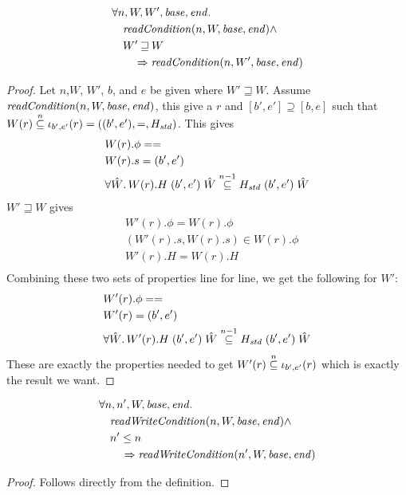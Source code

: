 \documentclass{article}
\newcommand{\nsubeq}[1][n]{\stackrel{\tiny{#1}}{\subseteq}}
\newcommand{\var}[1]{\mathit{#1}}
\newcommand{\start}{\var{base}}
\newcommand{\addrend}{\var{end}}
\newcommand{\plainfun}[2]{
  \ifthenelse{\equal{#2}{}}
             {\mathit{#1}}
             {\mathit{#1}(#2)}
}
\newcommand{\readCond}[1]{\plainfun{readCondition}{#1}}
\newcommand{\writeCond}[1]{\plainfun{readWriteCondition}{#1}}
\newcommand{\future}{\mathbin{\sqsupseteq}}
\begin{document}
\begin{lemma}
\label{lem:readCond-mono-world}
  \begin{align*}
    &\forall n,W,W',\start, \addrend \ldotp \\
    &\quad  \readCond{n,W,\start,\addrend} \land \\
    &\quad  W' \future W \\
    &\qquad \Rightarrow \readCond{n,W',\start,\addrend}
  \end{align*}
\end{lemma}
\begin{proof}
Let $n$,$W$, $W'$, $b$, and $e$ be given where $W' \future W$. Assume $\readCond{n,W,\start,\addrend}$, this give a $r$ and $[b',e'] \supseteq [b,e]$ such that $W(r) \nsubeq \iota_{b',e'} (r) = ((b',e'),=,H_{\var{std}})$. This gives
\begin{align*}
  &W(r).\phi = = \\
  &W(r).s    = (b',e') \\
  &\forall \hat{W} \ldotp W(r).H\; (b',e') \; \hat{W} \nsubeq[n-1] H_{\var{std}}\; (b',e') \; \hat{W}
\end{align*}
$W' \future W$ gives
\begin{align*}
  &W'(r).\phi = W(r).\phi \\
  &(W'(r).s,W(r).s) \in W(r).\phi \\
  &W'(r).H = W(r).H \\
 \end{align*}
Combining these two sets of properties line for line, we get the following for $W'$:
\begin{align*}
  & W'(r).\phi = = \\
  & W'(r) = (b',e') \\
  &\forall \hat{W} \ldotp W'(r).H\; (b',e') \; \hat{W} \nsubeq[n-1] H_{\var{std}}\; (b',e') \; \hat{W}
\end{align*}
These are exactly the properties needed to get $W'(r) \nsubeq \iota_{b',e'} (r)$ which is exactly the result we want.
\end{proof}

\begin{lemma}
  \begin{align*}
    & \forall n,n',W,\start, \addrend \ldotp\\
    &\quad \writeCond{n,W,\start,\addrend} \land\\
    &\quad  n' \leq n\\
    &\qquad \Rightarrow \writeCond{n',W,\start,\addrend}
  \end{align*}
\end{lemma}
\begin{proof}
  Follows directly from the definition.
\end{proof}
\end{document}
